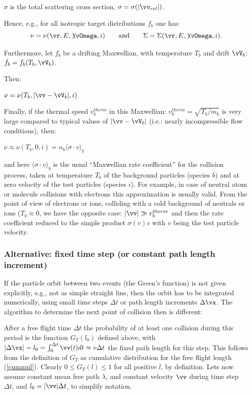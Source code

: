 $\sigma$ is the total scattering cross section, $\sigma =
\sigma(|\vv_{rel}|)$.

Hence, e.g., for all isotropic target distributions $f_b$ one has:
\begin{displaymath}
\nu = \nu(\vr,E,\not\! \vOmega,i) \qquad
\mbox{and} \qquad \Sigma = \Sigma(\vr,E,\not\!\vOmega,i).
\end{displaymath}

Furthermore, let $f_b$ be a drifting Maxwellian, with temperature
$T_b$ and drift $\vV_b$: $f_b =
f_b(T_b,\vV_b)$.

Then:

$\nu = \nu(T_b,|\vv-\vV_b|,i)$

Finally, if the thermal speed $v_b^{therm}$ in this Maxwellian:
$v_b^{therm} = \sqrt{T_b/m_b}$ is very large compared to
typical values of $|\vv-\vV_b|$ (i.e.: nearly
incompressible flow conditions), then:


$\nu \approx \nu(T_b,0,i) = n_b \langle\sigma \cdot v\rangle_b$

and here $\langle\sigma \cdot v\rangle_b$ is the usual
``Maxwellian rate coefficient'' for the collision process, taken at
temperature $T_b$ of the background particles (species $b$) and at
zero velocity of the test particles (species $i$). For example, in
case of neutral atom or molecule collisions with electrons this
approximation is usually valid.
From the point of view of electrons or ions, colliding with a cold background of neutrals or ions ($T_b\approx 0$,
we have the opposite case: $|\vv|\gg v_b^{therm}$ and then the rate coefficient reduced to
the simple product $\sigma(v) v$ with $v$ being the test particle velocity.

\subsubsection{Alternative: fixed time step (or constant path length increment)}
If the particle orbit between two events (the Green's function) is not given explicitly,
e.g., not as simple straight line, then the orbit has to be integrated numerically, using small
time steps $\Delta t$ or path length increments $\Delta \vx$.
The algorithm to determine the next point of collision then is different:

After a free flight  time  $\Delta t$ the probability of at least one collision during this period is the function
$G_T(l_0)$ defined above, with $|\Delta \vx| = l_0 = \int_0^{\Delta t} \vv(t) dt \approx v \Delta t$ the fixed path length for this step.
This follows from
the definition of $G_T$ as cumulative distribution for the free flight length (\ref{cummul}).
Clearly $0\le G_T(l) \le 1$ for all positive $l$, by definition.
Lets now
assume constant mean free path $\lambda$, and constant velocity $\vv$ during time step $\Delta t$, and $l_0=|\vv| \Delta t$, to simplify notation.

